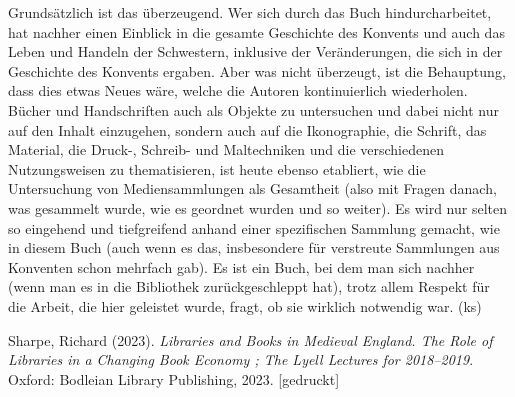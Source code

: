 \documentclass[a4paper,
fontsize=11pt,
oneside,
numbers=noperiodatend,
parskip=half-,
bibliography=totoc,
final
]{scrartcl}
\begin{document}
Grundsätzlich ist das überzeugend. Wer sich durch das Buch
hindurcharbeitet, hat nachher einen Einblick in die gesamte Geschichte
des Konvents und auch das Leben und Handeln der Schwestern, inklusive
der Veränderungen, die sich in der Geschichte des Konvents ergaben. Aber
was nicht überzeugt, ist die Behauptung, dass dies etwas Neues wäre,
welche die Autoren kontinuierlich wiederholen. Bücher und Handschriften
auch als Objekte zu untersuchen und dabei nicht nur auf den Inhalt
einzugehen, sondern auch auf die Ikonographie, die Schrift, das
Material, die Druck-, Schreib- und Maltechniken und die verschiedenen
Nutzungsweisen zu thematisieren, ist heute ebenso etabliert, wie die
Untersuchung von Mediensammlungen als Gesamtheit (also mit Fragen
danach, was gesammelt wurde, wie es geordnet wurden und so weiter). Es
wird nur selten so eingehend und tiefgreifend anhand einer spezifischen
Sammlung gemacht, wie in diesem Buch (auch wenn es das, insbesondere für
verstreute Sammlungen aus Konventen schon mehrfach gab). Es ist ein
Buch, bei dem man sich nachher (wenn man es in die Bibliothek
zurückgeschleppt hat), trotz allem Respekt für die Arbeit, die hier
geleistet wurde, fragt, ob sie wirklich notwendig war. (ks)

Sharpe, Richard (2023). \emph{Libraries and Books in Medieval England.
The Role of Libraries in a Changing Book Economy ; The Lyell Lectures
for 2018--2019}. Oxford: Bodleian Library Publishing, 2023.
{[}gedruckt{]}
\end{document}
